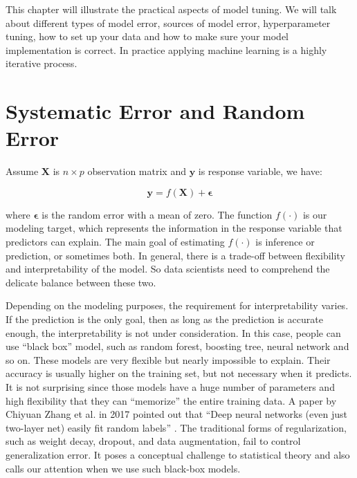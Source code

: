 \documentclass[12pt,]{krantz}
\theoremstyle{definition}
\theoremstyle{definition}
\theoremstyle{definition}
\theoremstyle{remark}
\begin{document}
This chapter will illustrate the practical aspects of model tuning. We
will talk about different types of model error, sources of model error,
hyperparameter tuning, how to set up your data and how to make sure your
model implementation is correct. In practice applying machine learning
is a highly iterative process.

\section{Systematic Error and Random
Error}\label{systematic-error-and-random-error}

Assume \(\mathbf{X}\) is \(n \times p\) observation matrix and
\(\mathbf{y}\) is response variable, we have:

\[\mathbf{y}=f(\mathbf{X})+\mathbf{\epsilon}\]

where \(\mathbf{\epsilon}\) is the random error with a mean of zero. The
function \(f(\cdot)\) is our modeling target, which represents the
information in the response variable that predictors can explain. The
main goal of estimating \(f(\cdot)\) is inference or prediction, or
sometimes both. In general, there is a trade-off between flexibility and
interpretability of the model. So data scientists need to comprehend the
delicate balance between these two.

Depending on the modeling purposes, the requirement for interpretability
varies. If the prediction is the only goal, then as long as the
prediction is accurate enough, the interpretability is not under
consideration. In this case, people can use ``black box'' model, such as
random forest, boosting tree, neural network and so on. These models are
very flexible but nearly impossible to explain. Their accuracy is
usually higher on the training set, but not necessary when it predicts.
It is not surprising since those models have a huge number of parameters
and high flexibility that they can ``memorize'' the entire training
data. A paper by Chiyuan Zhang et al. in 2017 pointed out that ``Deep
neural networks (even just two-layer net) easily fit random labels''
\citep{rethinkDL}. The traditional forms of regularization, such as
weight decay, dropout, and data augmentation, fail to control
generalization error. It poses a conceptual challenge to statistical
theory and also calls our attention when we use such black-box models.
\end{document}
